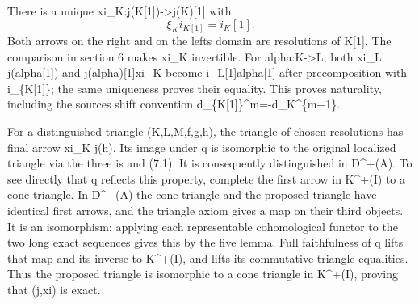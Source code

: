 There is a unique xi\_\allowbreak{}K:\allowbreak{}j(K[1]\allowbreak{})\allowbreak{}\allowbreak{}->j(K)\allowbreak{}[1]\allowbreak{} with \[
 \xi_K i_{K[1]}=i_K[1].
                                                               \tag{7.1}
\] Both arrows on the right and on the left\textquotesingle s domain are resolutions of K[1]\allowbreak{}. The comparison in section 6 makes xi\_\allowbreak{}K invertible. For alpha:\allowbreak{}K\allowbreak{}->L,\allowbreak{} both xi\_\allowbreak{}L j(alpha[1]\allowbreak{})\allowbreak{} and j(alpha)\allowbreak{}[1]\allowbreak{}xi\_\allowbreak{}K become i\_\allowbreak{}L[1]\allowbreak{}alpha[1]\allowbreak{} after precomposition with i\_\allowbreak{}\{K[1]\allowbreak{}\}; the same uniqueness proves their equality. This proves naturality,\allowbreak{} including the source\textquotesingle s shift convention d\_\allowbreak{}\{K[1]\allowbreak{}\}\textasciicircum{}m\allowbreak{}=-d\_\allowbreak{}K\textasciicircum{}\{m\allowbreak{}+1\}.

For a distinguished triangle (K,\allowbreak{}L,\allowbreak{}M,\allowbreak{}f,\allowbreak{}g,\allowbreak{}h)\allowbreak{},\allowbreak{} the triangle of chosen resolutions has final arrow xi\_\allowbreak{}K j(h)\allowbreak{}. Its image under q is isomorphic to the original localized triangle via the three i\textquotesingle s and (7.1)\allowbreak{}. It is consequently distinguished in D\textasciicircum{}\allowbreak{}+(A)\allowbreak{}. To see directly that q reflects this property,\allowbreak{} complete the first arrow in K\textasciicircum{}\allowbreak{}+(I)\allowbreak{} to a cone triangle. In D\textasciicircum{}\allowbreak{}+(A)\allowbreak{} the cone triangle and the proposed triangle have identical first arrows,\allowbreak{} and the triangle axiom gives a map on their third objects. It is an isomorphism:\allowbreak{} applying each representable cohomological functor to the two long exact sequences gives this by the five lemma. Full faithfulness of q lifts that map and its inverse to K\textasciicircum{}\allowbreak{}+(I)\allowbreak{},\allowbreak{} and lifts its commutative triangle equalities. Thus the proposed triangle is isomorphic to a cone triangle in K\textasciicircum{}\allowbreak{}+(I)\allowbreak{},\allowbreak{} proving that (j,\allowbreak{}xi)\allowbreak{} is exact.


